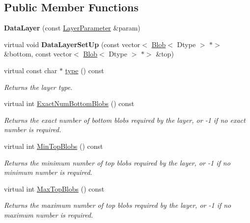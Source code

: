 \subsection*{Public Member Functions}
\begin{DoxyCompactItemize}
\item 
\mbox{\label{classcaffe_1_1_data_layer_a55d92ba6737e695551eca610868f1fae}} 
{\bfseries Data\+Layer} (const \mbox{\hyperlink{classcaffe_1_1_layer_parameter}{Layer\+Parameter}} \&param)
\item 
\mbox{\label{classcaffe_1_1_data_layer_acac617f0f29b3b6eb3e3ae4a470c915e}} 
virtual void {\bfseries Data\+Layer\+Set\+Up} (const vector$<$ \mbox{\hyperlink{classcaffe_1_1_blob}{Blob}}$<$ Dtype $>$ $\ast$$>$ \&bottom, const vector$<$ \mbox{\hyperlink{classcaffe_1_1_blob}{Blob}}$<$ Dtype $>$ $\ast$$>$ \&top)
\item 
\mbox{\label{classcaffe_1_1_data_layer_a6a5198f51cb51854be3d2d1e7891eeae}} 
virtual const char $\ast$ \mbox{\hyperlink{classcaffe_1_1_data_layer_a6a5198f51cb51854be3d2d1e7891eeae}{type}} () const
\begin{DoxyCompactList}\small\item\em Returns the layer type. \end{DoxyCompactList}\item 
virtual int \mbox{\hyperlink{classcaffe_1_1_data_layer_a2b6fa99ededf0863d8bab4a7a46addae}{Exact\+Num\+Bottom\+Blobs}} () const
\begin{DoxyCompactList}\small\item\em Returns the exact number of bottom blobs required by the layer, or -\/1 if no exact number is required. \end{DoxyCompactList}\item 
virtual int \mbox{\hyperlink{classcaffe_1_1_data_layer_ab0c5a7504085a6699272cdcfa8611887}{Min\+Top\+Blobs}} () const
\begin{DoxyCompactList}\small\item\em Returns the minimum number of top blobs required by the layer, or -\/1 if no minimum number is required. \end{DoxyCompactList}\item 
virtual int \mbox{\hyperlink{classcaffe_1_1_data_layer_ac47e9f3bff3db9d7364f6c392427745c}{Max\+Top\+Blobs}} () const
\begin{DoxyCompactList}\small\item\em Returns the maximum number of top blobs required by the layer, or -\/1 if no maximum number is required. \end{DoxyCompactList}\item 

\end{DoxyCompactItemize}
